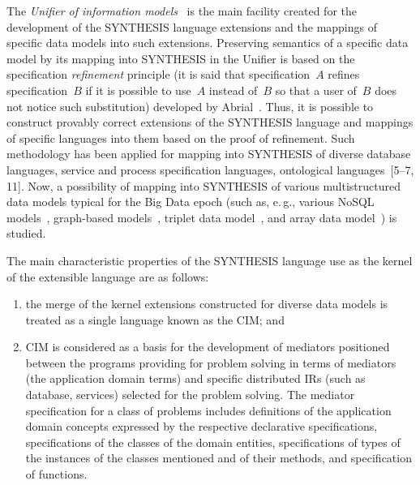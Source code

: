 \begin{multicols}{2}
  The \textit{Unifier of information models}~\cite{11-kal} is the main facility
created for the development of the SYNTHESIS language extensions and the
mappings of specific data models into such extensions. Preserving semantics of a
specific data model by its mapping into SYNTHESIS in the Unifier is based on the
specification \textit{refinement} principle (it is said that specification~$A$ refines
specification~$B$ if it is possible to use~$A$ instead of~$B$ so that a user of~$B$
does not notice such substitution) developed by Abrial~\cite{12-kal}. Thus, it is
possible to construct provably correct extensions of the SYNTHESIS language and
mappings of specific languages into them based on the proof of refinement. Such
methodology has been applied for mapping into SYNTHESIS of diverse database
languages, service and process specification languages, ontological
languages~[5--7, 11]. Now, a possibility of mapping into
SYNTHESIS of various multistructured data models typical for the Big Data epoch
(such as, e.\,g., various NoSQL models~\cite{13-kal}, graph-based
  models~\cite{14-kal}, triplet data model~\cite{15-kal}, and array data
  model~\cite{16-kal}) is studied.

The main characteristic properties of the SYNTHESIS language use as the kernel of the
extensible language are as follows:
  \begin{enumerate}[(1)]
  \item  the merge of the kernel extensions constructed for diverse data models is
treated as a single language known as the CIM; and
  \item CIM is considered as a basis for the development of mediators positioned
between the programs providing for problem solving in terms of mediators (the
application domain terms) and specific distributed IRs (such as database, services)
selected for the problem solving. The mediator specification for a class of problems
includes definitions of the application domain concepts expressed by the respective
declarative specifications, specifications of the classes of the domain entities,
specifications of types of the instances of the classes mentioned and of their methods, and
specification of functions.
  \end{enumerate}


\end{multicols}
